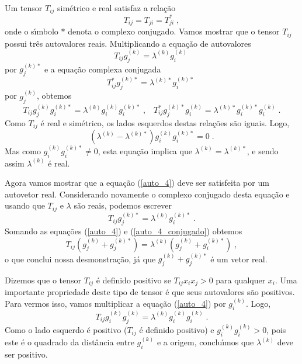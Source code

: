 Um tensor $T_{ij}$ sim\'etrico e real satisfaz a rela\c{c}\~ao
\begin{equation}
   T_{ij}=T_{ji}=T_{ji}^{*} \;,
   \label{T_sim}
\end{equation}
onde o s\'{\i}mbolo $*$ denota o complexo conjugado. Vamos mostrar
que o tensor $T_{ij}$ possui tr\^es autovalores reais.
Multiplicando a equa\c{c}\~ao de autovalores
\begin{equation}
   T_{ij} g_j^{(k)} = \lambda^{(k)} g_i^{(k)} \;
   \label{auto_4}
\end{equation}
por $g_j^{(k)*}$ e a equa\c{c}\~ao complexa conjugada
\begin{equation}
   T_{ij}^{*} g_j^{(k)*} = \lambda^{(k)*} g_i^{(k)*} \;
   \label{auto_5}
\end{equation}
por $g_j^{(k)}$, obtemos
\begin{equation}
   T_{ij} g_j^{(k)} g_i^{(k)*}= \lambda^{(k)} g_i^{(k)}
   g_i^{(k)*} \;, \;\;\; T_{ij}^{*} g_j^{(k)*} g_i^{(k)}= \lambda^{(k)*} g_i^{(k)*}
   g_i^{(k)}\;.
   \label{auto_6}
\end{equation}
Como $T_{ij}$ \'e real e sim\'etrico, os lados esquerdos destas
rela\c{c}\~oes s\~ao iguais. Logo,
\begin{equation}
   (\lambda^{(k)}-\lambda^{(k)*}) g_i^{(k)} g_i^{(k)*}= 0 \;.
   \label{auto_7}
\end{equation}
Mas como $g_i^{(k)} g_i^{(k)*} \neq 0$, esta equa\c{c}\~ao implica
que $\lambda^{(k)}=\lambda^{(k)*}$, e sendo assim $\lambda^{(k)}$
\'e real.

Agora vamos mostrar que a equa\c{c}\~ao (\ref{auto_4}) deve ser
satisfeita por um autovetor real. Considerando novamente o
complexo conjugado desta equa\c{c}\~ao e usando que $T_{ij}$ e
$\lambda$ s\~ao reais, podemos escrever
\begin{equation}
   T_{ij} g_j^{(k)*} = \lambda^{(k)} g_i^{(k)*} \;.
   \label{auto_4_conjugado}
\end{equation}
Somando as equa\c{c}\~oes (\ref{auto_4}) e
(\ref{auto_4_conjugado}) obtemos
\begin{equation}
   T_{ij} (g_j^{(k)}+g_j^{(k)*}) = \lambda^{(k)} (g_j^{(k)}+g_i^{(k)*})
   \;,
   \label{auto_4_conjugado2}
\end{equation}
o que conclui nossa desmonstra\c{c}\~ao, j\'a que
$g_j^{(k)}+g_j^{(k)*}$ \'e um vetor real.

Dizemos que o tensor $T_{ij}$ \'e definido positivo se $T_{ij}x_i
x_j >0$ para qualquer $x_i$. Uma importante propriedade deste tipo
de tensor \'e que seus autovalores s\~ao positivos. Para vermos
isso, vamos multiplicar a equa\c{c}\~ao (\ref{auto_4}) por
$g_i^{(k)}$. Logo,
\begin{equation}
   T_{ij} g_i^{(k)}g_j^{(k)} = \lambda^{(k)} g_i^{(k)}g_i^{(k)} \;.
   \label{auto_4_lambda}
\end{equation}
Como o lado esquerdo \'e positivo ($T_{ij}$ \'e definido positivo)
e $g_i^{(k)}g_i^{(k)}>0$, pois este \'e o quadrado da dist\^ancia
entre $g_i^{(k)}$ e a origem, conclu\'{\i}mos que $\lambda^{(k)}$
deve ser positivo.

